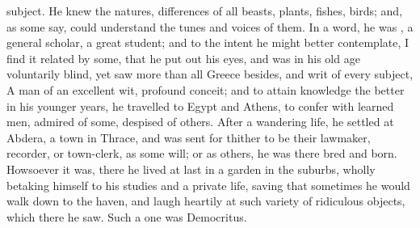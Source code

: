 {subject. He knew the natures, differences of all beasts, plants,
fishes, birds; and, as some say, could understand the tunes and
voices of them. In a word, he was , a general scholar,
a great student; and to the intent he might better contemplate, I
find it related by some, that he put out his eyes, and was in his old
age voluntarily blind, yet saw more than all Greece besides, and 
writ of every subject,  A man of an excellent wit, profound conceit; and to
attain knowledge the better in his younger years, he travelled to Egypt
and  Athens, to confer with learned men, admired of some,
despised of others. After a wandering life, he settled at Abdera, a
town in Thrace, and was sent for thither to be their lawmaker,
recorder, or town-clerk, as some will; or as others, he was there bred
and born. Howsoever it was, there he lived at last in a garden in the
suburbs, wholly betaking himself to his studies and a private life,
saving that sometimes he would walk down to the haven, and
laugh heartily at such variety of ridiculous objects, which there he
saw. Such a one was Democritus.

}
